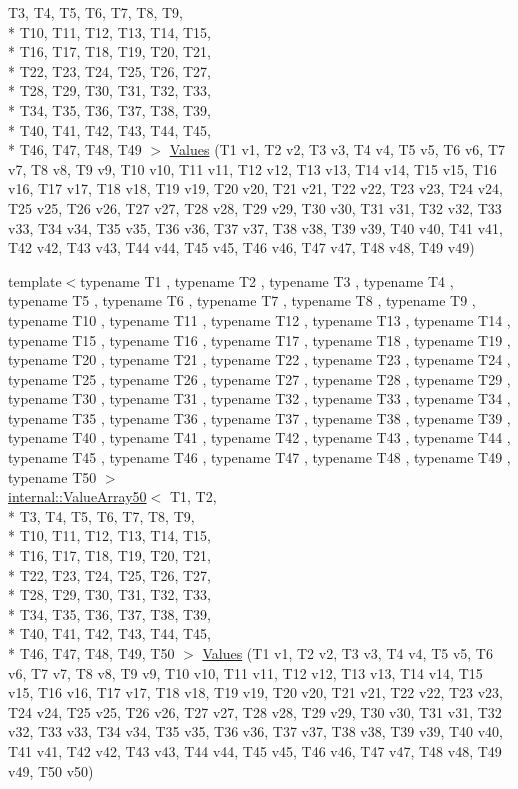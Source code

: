 \begin{DoxyCompactItemize}
T3, T4, T5, T6, T7, T8, T9, \\*
T10, T11, T12, T13, T14, T15, \\*
T16, T17, T18, T19, T20, T21, \\*
T22, T23, T24, T25, T26, T27, \\*
T28, T29, T30, T31, T32, T33, \\*
T34, T35, T36, T37, T38, T39, \\*
T40, T41, T42, T43, T44, T45, \\*
T46, T47, T48, T49 $>$ \hyperlink{namespacetesting_a034785cd0f04e5f5ec9e16c1cad5ccde}{Values} (T1 v1, T2 v2, T3 v3, T4 v4, T5 v5, T6 v6, T7 v7, T8 v8, T9 v9, T10 v10, T11 v11, T12 v12, T13 v13, T14 v14, T15 v15, T16 v16, T17 v17, T18 v18, T19 v19, T20 v20, T21 v21, T22 v22, T23 v23, T24 v24, T25 v25, T26 v26, T27 v27, T28 v28, T29 v29, T30 v30, T31 v31, T32 v32, T33 v33, T34 v34, T35 v35, T36 v36, T37 v37, T38 v38, T39 v39, T40 v40, T41 v41, T42 v42, T43 v43, T44 v44, T45 v45, T46 v46, T47 v47, T48 v48, T49 v49)
\item 
{\footnotesize template$<$typename T1 , typename T2 , typename T3 , typename T4 , typename T5 , typename T6 , typename T7 , typename T8 , typename T9 , typename T10 , typename T11 , typename T12 , typename T13 , typename T14 , typename T15 , typename T16 , typename T17 , typename T18 , typename T19 , typename T20 , typename T21 , typename T22 , typename T23 , typename T24 , typename T25 , typename T26 , typename T27 , typename T28 , typename T29 , typename T30 , typename T31 , typename T32 , typename T33 , typename T34 , typename T35 , typename T36 , typename T37 , typename T38 , typename T39 , typename T40 , typename T41 , typename T42 , typename T43 , typename T44 , typename T45 , typename T46 , typename T47 , typename T48 , typename T49 , typename T50 $>$ }\\\hyperlink{classtesting_1_1internal_1_1ValueArray50}{internal\-::\-Value\-Array50}$<$ T1, T2, \\*
T3, T4, T5, T6, T7, T8, T9, \\*
T10, T11, T12, T13, T14, T15, \\*
T16, T17, T18, T19, T20, T21, \\*
T22, T23, T24, T25, T26, T27, \\*
T28, T29, T30, T31, T32, T33, \\*
T34, T35, T36, T37, T38, T39, \\*
T40, T41, T42, T43, T44, T45, \\*
T46, T47, T48, T49, T50 $>$ \hyperlink{namespacetesting_a7b6008393a1fa7b55b07fbad67c1c811}{Values} (T1 v1, T2 v2, T3 v3, T4 v4, T5 v5, T6 v6, T7 v7, T8 v8, T9 v9, T10 v10, T11 v11, T12 v12, T13 v13, T14 v14, T15 v15, T16 v16, T17 v17, T18 v18, T19 v19, T20 v20, T21 v21, T22 v22, T23 v23, T24 v24, T25 v25, T26 v26, T27 v27, T28 v28, T29 v29, T30 v30, T31 v31, T32 v32, T33 v33, T34 v34, T35 v35, T36 v36, T37 v37, T38 v38, T39 v39, T40 v40, T41 v41, T42 v42, T43 v43, T44 v44, T45 v45, T46 v46, T47 v47, T48 v48, T49 v49, T50 v50)

\end{DoxyCompactItemize}
